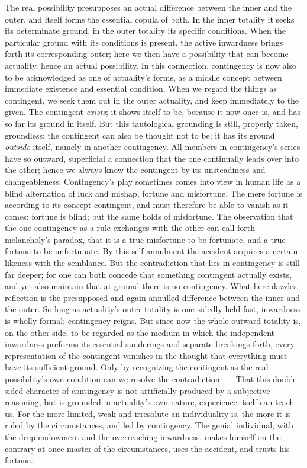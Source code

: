 \documentclass[12pt]{book}
\begin{document}
The real possibility presupposes an actual difference between the inner and
the outer, and itself forms the essential copula of both. In the inner
totality it seeks its determinate ground, in the outer totality its specific
conditions. When the particular ground with its conditions is present, the
active inwardness brings forth its corresponding outer; here we then have a
possibility that can become actuality, hence an actual possibility. In this
connection, contingency is now also to be acknowledged as one of actuality's
forms, as a middle concept between immediate existence and essential
condition. When we regard the things as contingent, we seek them out in the
outer actuality, and keep immediately to the given. The contingent
\emph{exists}; it shows itself to be, because it now once is, and has so far
its ground in itself. But this tautological grounding is still, properly
taken, groundless: the contingent can also be thought not to be; it has its
ground \emph{outside} itself, namely in another contingency. All members in
contingency's series have so outward, superficial a connection that the one
continually leads over into the other; hence we always know the contingent
by its unsteadiness and changeableness. Contingency's play sometimes comes
into view in human life as a blind alternation of luck and mishap, fortune
and misfortune. The mere fortune is according to its concept contingent, and
must therefore be able to vanish as it comes: fortune is blind; but the same
holds of misfortune. The observation that the one contingency as a rule
exchanges with the other can call forth melancholy's paradox, that it is a
true misfortune to be fortunate, and a true fortune to be unfortunate. By
this self-annulment the accident acquires a certain likeness with the
semblance. But the contradiction that lies in contingency is still far
deeper; for one can both concede that something contingent actually exists,
and yet also maintain that at ground there is no contingency. What here
dazzles reflection is the presupposed and again annulled difference between
the inner and the outer. So long as actuality's outer totality is
one-sidedly held fast, inwardness is wholly formal; contingency reigns. But
since now the whole outward totality is, on the other side, to be regarded
as the medium in which the independent inwardness preforms its essential
sunderings and separate breakings-forth, every representation of the
contingent vanishes in the thought that everything must have its sufficient
ground. Only by recognizing the contingent as the real possibility's own
condition can we resolve the contradiction. --- That this double-sided
character of contingency is not artificially produced by a subjective
reasoning, but is grounded in actuality's own nature, experience itself can
teach us. For the more limited, weak and irresolute an individuality is, the
more it is ruled by the circumstances, and led by contingency. The genial
individual, with the deep endowment and the overreaching inwardness, makes
himself on the contrary at once master of the circumstances, uses the
accident, and trusts his fortune.
\end{document}
